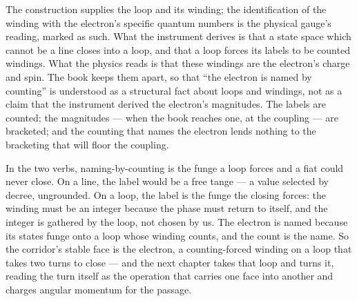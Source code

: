 The construction supplies the loop and its winding; the identification of the winding with the electron's specific quantum
numbers is the physical gauge's reading, marked as such. What the instrument derives is that a state space which cannot be a
line closes into a loop, and that a loop forces its labels to be counted windings. What the physics reads is that these
windings are the electron's charge and spin. The book keeps them apart, so that ``the electron is named by counting'' is
understood as a structural fact about loops and windings, not as a claim that the instrument derived the electron's
magnitudes. The labels are counted; the magnitudes --- when the book reaches one, at the coupling --- are bracketed; and the
counting that names the electron lends nothing to the bracketing that will floor the coupling.

In the two verbs, naming-by-counting is the funge a loop forces and a fiat could never close. On a line, the label would be a
free tange --- a value selected by decree, ungrounded. On a loop, the label is the funge the closing forces: the winding must
be an integer because the phase must return to itself, and the integer is gathered by the loop, not chosen by us. The
electron is named because its states funge onto a loop whose winding counts, and the count is the name. So the corridor's
stable face is the electron, a counting-forced winding on a loop that takes two turns to close --- and the next chapter takes
that loop and turns it, reading the turn itself as the operation that carries one face into another and charges angular
momentum for the passage.
